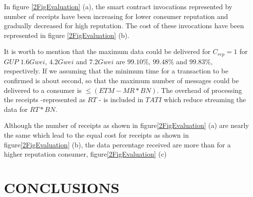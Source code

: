 \documentclass[letterpaper, 10 pt, conference]{ieeeconf}  %
\begin{document}
 In figure \ref{2FigEvaluation} (a), the smart contract invocations represented by number of receipts have been increasing for lower consumer reputation and gradually decreased for high reputation. The cost of these invocations have been represented in figure \ref{2FigEvaluation} (b).
 


It is worth to mention that the maximum data could be delivered for $C_{rep} = 1 $ for $GUP$ $1.6 Gwei$, $4.2 Gwei$ and $7.2 Gwei$ are $99.10 \%$, $99.48 \%$ and $99.83 \%$, respectively. If we assuming that the minimum time for a transaction to be confirmed is about second, so that the maximum number of messages could be delivered to a consumer is $ \leq (ETM - MR * BN)$. The overhead of processing the receipts -represented as $RT$ - is included in $TATI$ which reduce streaming the data for $RT * BN$.

Although the number of receipts as shown in figure\ref{2FigEvaluation} (a) are nearly the same which lead to the equal cost for receipts as shown in figure\ref{2FigEvaluation} (b), the data percentage received are more than for a higher reputation consumer, figure\ref{2FigEvaluation} (c)



\section{CONCLUSIONS} \label{conclusion}
\end{document}
